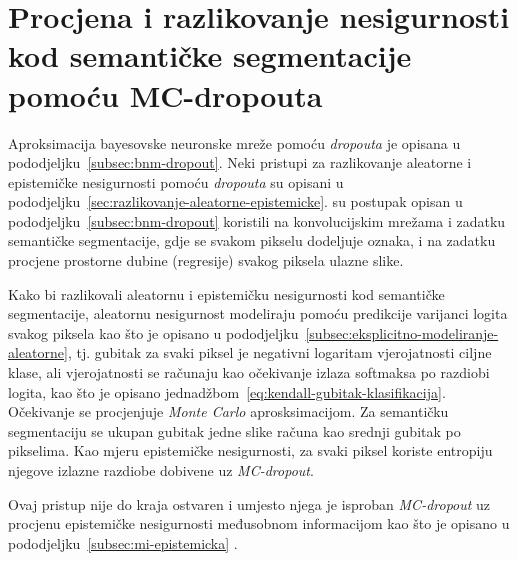 \documentclass[utf8, diplomski, lmodern]{fer}
\begin{document}
\section{Procjena i razlikovanje nesigurnosti kod semantičke segmentacije pomoću MC-dropouta}

Aproksimacija bayesovske neuronske mreže pomoću \textit{dropouta} \citep{Gal:2015:DBA,Gal:2015:DBA,Gal:2016:BCNNBAVI} je opisana u pododjeljku~\ref{subsec:bnm-dropout}. Neki pristupi \citep{Kendall:2017:WUNBDLCV,Smith:2018:UMUAED} za razlikovanje aleatorne i epistemičke nesigurnosti pomoću \textit{dropouta} su opisani u pododjeljku~\ref{sec:razlikovanje-aleatorne-epistemicke}. \citet{Kendall:2017:WUNBDLCV} su postupak opisan u pododjeljku~\ref{subsec:bnm-dropout} koristili na konvolucijskim mrežama i zadatku semantičke segmentacije, gdje se svakom pikselu dodeljuje oznaka, i na zadatku procjene prostorne dubine (regresije) svakog piksela ulazne slike. 

Kako bi razlikovali aleatornu i epistemičku nesigurnosti kod semantičke segmentacije, \citet{Kendall:2017:WUNBDLCV} aleatornu nesigurnost modeliraju pomoću predikcije varijanci logita svakog piksela kao što je opisano u pododjeljku~\ref{subsec:eksplicitno-modeliranje-aleatorne}, tj. gubitak za svaki piksel je negativni logaritam vjerojatnosti ciljne klase, ali vjerojatnosti se računaju kao očekivanje izlaza softmaksa po razdiobi logita, kao što je opisano jednadžbom~\eqref{eq:kendall-gubitak-klasifikacija}. Očekivanje se procjenjuje \textit{Monte Carlo} aprosksimacijom. Za semantičku segmentaciju se ukupan gubitak jedne slike računa kao srednji gubitak po pikselima. Kao mjeru epistemičke nesigurnosti, \citet{Kendall:2017:WUNBDLCV} za svaki piksel koriste entropiju njegove izlazne razdiobe dobivene uz \textit{MC-dropout}.

Ovaj pristup nije do kraja ostvaren i umjesto njega je isproban \textit{MC-dropout} uz procjenu epistemičke nesigurnosti međusobnom informacijom kao što je opisano u pododjeljku~\ref{subsec:mi-epistemicka} \citep{Smith:2018:UMUAED}. 
\end{document}
